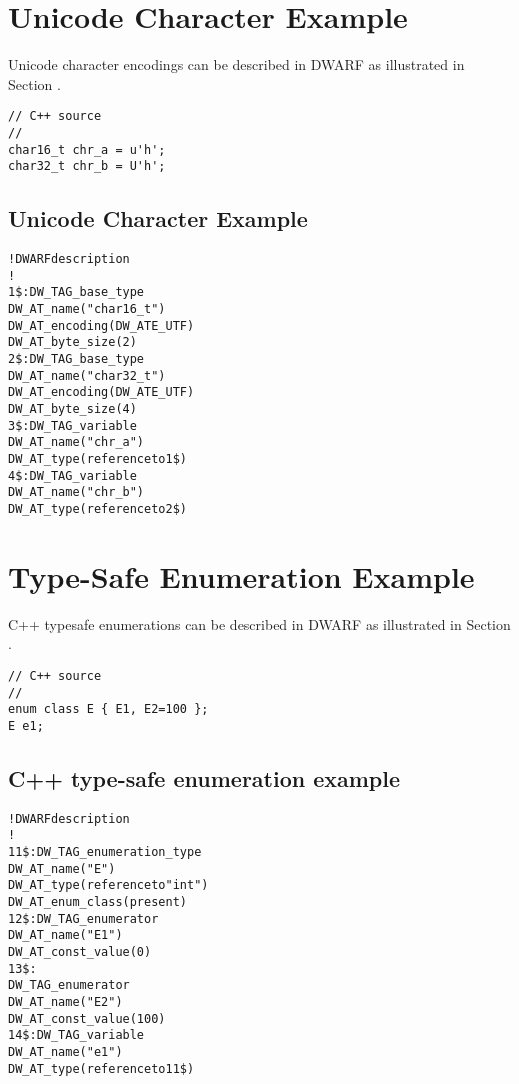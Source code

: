 \section{Unicode Character Example}
\label{app:unicodecharacterexample}

Unicode character encodings can be described in DWARF as
illustrated in 
Section .

\begin{lstlisting}
// C++ source
//
char16_t chr_a = u'h';
char32_t chr_b = U'h';
\end{lstlisting}

\subsection{Unicode Character Example}
\label{app:unicodecharacterexamplesub}
\begin{alltt}

! DWARF description
!
1\$: DW\_TAG\_base\_type
        DW\_AT\_name("char16\_t")
        DW\_AT\_encoding(DW\_ATE\_UTF)
        DW\_AT\_byte\_size(2)
2\$: DW\_TAG\_base\_type
        DW\_AT\_name("char32\_t")
        DW\_AT\_encoding(DW\_ATE\_UTF)
        DW\_AT\_byte\_size(4)
3\$: DW\_TAG\_variable
        DW\_AT\_name("chr\_a")
        DW\_AT\_type(reference to 1\$)
4\$: DW\_TAG\_variable
        DW\_AT\_name("chr\_b")
        DW\_AT\_type(reference to 2\$)
\end{alltt}



\section{Type-Safe Enumeration Example}
\label{app:typesafeenumerationexample}


C++ type\dash safe enumerations can be described in DWARF as illustrated in 
Section .

\begin{lstlisting}
// C++ source
//
enum class E { E1, E2=100 };
E e1;
\end{lstlisting}

\subsection{C++ type-safe enumeration example}
\label{app:ctypesafeenumerationexample}
\begin{alltt}
! DWARF description
!
11\$: DW\_TAG\_enumeration\_type
        DW\_AT\_name("E")
        DW\_AT\_type(reference to "int")
        DW\_AT\_enum\_class(present)
12\$:   DW\_TAG\_enumerator
            DW\_AT\_name("E1")
            DW\_AT\_const\_value(0)
13\$:
         DW\_TAG\_enumerator
            DW\_AT\_name("E2")
            DW\_AT\_const\_value(100)
14\$: DW\_TAG\_variable
        DW\_AT\_name("e1")
        DW\_AT\_type(reference to 11\$)
\end{alltt}

